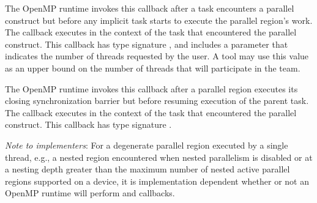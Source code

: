 \documentclass{article}
\newcommand{\descheader}[1]{{\needspace{3\baselineskip}\vspace{1em}\noindent \fbox{#1}}}
\begin{document}
\begin{description}

\item {}

\sloppy
The OpenMP runtime invokes this callback 
after a task encounters a parallel construct
but before any implicit task starts to execute the
parallel region's work. The callback executes in the context of the task that encountered the parallel construct.
This callback has type signature , and includes a parameter that indicates the number of threads requested by the user. 
A tool may use this value as an upper bound on the number of threads that will participate in the team.



\item {}

The OpenMP runtime invokes this callback 
after a parallel
region executes its closing synchronization barrier but before
resuming execution of the parent task.  The callback executes in
the context of the task that encountered the parallel construct.
This callback has type signature . 

\end{description}

\noindent
{\em Note to implementers}: For a degenerate parallel region executed by a single thread, e.g.,
a nested region encountered when nested parallelism is disabled or at a nesting depth greater than the 
maximum number of nested active parallel regions supported on a device, 
it is implementation dependent whether or not an OpenMP runtime will perform
  and  callbacks.

\descheader{Tasks}
\end{document}
